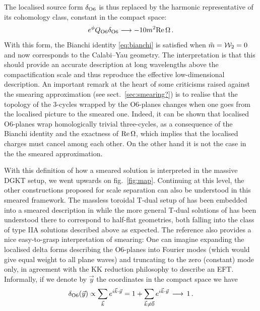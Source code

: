 \documentclass[11pt, a4paper]{article}
\newcommand{\W}{{\cal W}}
\renewcommand{\Re}{{\rm Re}\,}
\begin{document}
The localised source form $\delta_{\rm O6}$ is thus replaced by the harmonic representative of its cohomology class, constant in the compact space:
\begin{equation}
e^{\phi}Q_{\rm O6}\delta_{\rm O6}\longrightarrow -10 m^2\Re\Omega\, .
\end{equation}
%
With this form, the Bianchi identity \eqref{eq:bianchi} is satisfied when $\tilde m=\W_2=0$ and now corresponds to the Calabi--Yau geometry. The interpretation is that this should provide an accurate description at long wavelengths above the compactification scale and thus reproduce the effective low-dimensional description. An important remark at the heart of some criticisms raised against the smearing approximation (see sect.~\ref{sec:smearing?}) is to realise that the topology of the 3-cycles wrapped by the O6-planes changes when one goes from the localised picture to the smeared one. Indeed, it can be shown \cite{Acharya:2006ne} that localised O6-planes wrap homologically trivial three-cycles, as a consequence of the Bianchi identity and the exactness of $\Re\Omega$, which implies that the localised charges must cancel among each other. On the other hand it is not the case in the the smeared approximation. 

With this definition of how a smeared solution is interpreted in the massive DGKT setup, we went upwards on fig.~\ref{fig:map}. Continuing at this level, the other constructions proposed for scale separation can also be understood in this smeared framework. The massless toroidal T-dual setup of \cite{Banks:2006hg} has been embedded into a smeared description in \cite{Caviezel:2008ik} while the more general T-dual solutions of \cite{Carrasco:2023hta} has been understood there to correspond to half-flat geometries, both falling into the class of type IIA solutions \cite{Behrndt:2004km,Behrndt:2004mj,Lust:2004ig} described above as expected. The reference \cite{Caviezel:2008ik} also provides a nice easy-to-grasp interpretation of smearing: One can imagine expanding the localised delta forms describing the O6-planes into Fourier modes (which would give equal weight to all plane waves) and truncating to the zero (constant) mode only, in agreement with the KK reduction philosophy to describe an EFT. Informally, if we denote by $\vec y$ the coordinates in the compact space we have
\begin{equation}
\delta_{\rm O6}(\vec y)\propto\sum_{\vec k}e^{i\vec k\cdot\vec y}=1+\sum_{\vec k\neq \vec 0}e^{i\vec k\cdot\vec y}\,\longrightarrow\, 1\, .
\end{equation}
\end{document}
